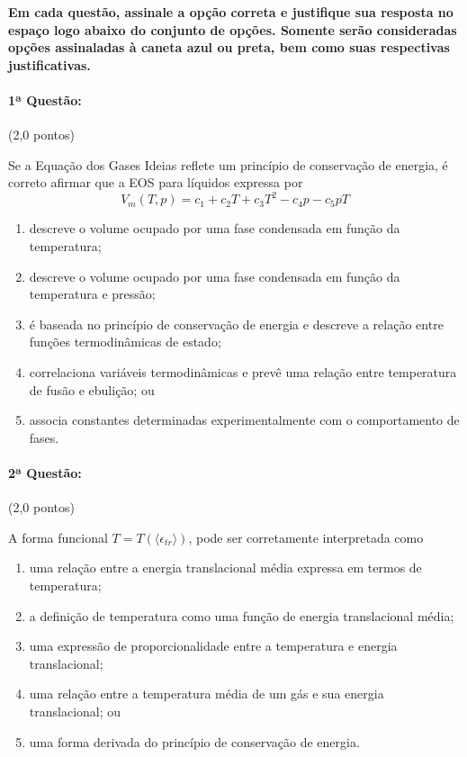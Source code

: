 \documentclass[12pt,a4paper]{article}
\begin{document}
\textbf{\large{Em cada questão, assinale a opção correta e justifique sua resposta no espaço logo abaixo do conjunto de opções. Somente serão consideradas opções assinaladas à caneta azul ou preta, bem como suas respectivas justificativas.}}


\paragraph{1ª Questão:} (2,0 pontos)



Se a Equação dos Gases Ideias reflete um princípio de conservação de energia, é correto afirmar que a EOS para líquidos expressa por 
\begin{equation*}
    V_{m}(T, p) = c_{1} + c_{2}T + c_{3} T^{2} - c_{4} p - c_{5}pT    
\end{equation*}

\begin{enumerate} [label = (\alph*)]
    \item descreve o volume ocupado por uma fase condensada em função da temperatura;
    \item descreve o volume ocupado por uma fase condensada em função da temperatura e pressão;
    \item é baseada no princípio de conservação de energia e descreve a relação entre funções termodinâmicas de estado;
    \item correlaciona variáveis termodinâmicas e prevê uma relação entre temperatura de fusão e ebulição; ou 
    \item associa constantes determinadas experimentalmente com o comportamento de fases.
\end{enumerate}

\newpage

\paragraph{2ª Questão:} (2,0 pontos)


A forma funcional $T = T \left(\langle \epsilon_{tr} \rangle\right)$, pode ser corretamente interpretada como
\begin{enumerate} [label = (\alph*)]
    \item uma relação entre a energia translacional média expressa em termos de temperatura;
    \item a definição de temperatura como uma função de energia translacional média;
    \item uma expressão de proporcionalidade entre a temperatura e energia translacional;
    \item uma relação entre a temperatura média de um gás e sua energia translacional; ou
    \item uma forma derivada do princípio de conservação de energia. 
\end{enumerate}
\end{document}
